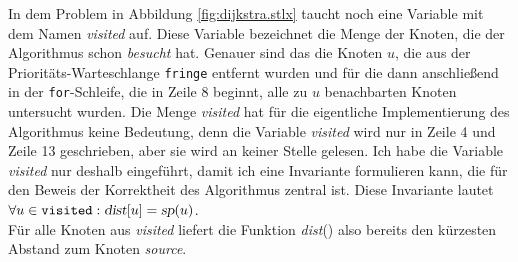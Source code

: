 In dem Problem in Abbildung \ref{fig:dijkstra.stlx} taucht noch eine Variable mit dem Namen \textsl{visited} auf.
Diese Variable bezeichnet die Menge der Knoten, die der Algorithmus schon \textsl{besucht}
hat.  Genauer sind das die Knoten $u$, die aus der Priorit\"ats-Warteschlange \texttt{fringe}
entfernt wurden und f\"ur die dann anschlie\ss{}end in der \texttt{for}-Schleife, die in Zeile 8
beginnt, alle zu $u$ benachbarten Knoten untersucht wurden.  
Die Menge \textsl{visited} hat f\"ur
die eigentliche Implementierung des Algorithmus keine Bedeutung, denn die Variable \textsl{visited}
wird nur in Zeile 4 und Zeile 13 geschrieben, aber sie wird an keiner Stelle gelesen.
Ich habe die Variable \textsl{visited} nur deshalb eingef\"uhrt, damit ich eine Invariante formulieren
kann, die f\"ur den Beweis der Korrektheit des Algorithmus zentral ist.  Diese Invariante lautet
\\[0.2cm]
\hspace*{1.3cm}
$\forall u\in\mathtt{visited}: \textsl{dist}[u] = \textsl{sp}(u)$.
\\[0.2cm]
F\"ur alle Knoten aus \textsl{visited} liefert die Funktion \textsl{dist}() also bereits den
k\"urzesten Abstand zum Knoten \textsl{source}.  
\vspace*{0.1cm}

